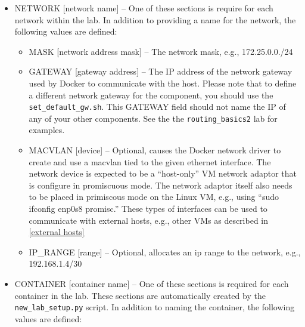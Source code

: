 \documentclass[12pt]{article}
\begin{document}
\begin{itemize}
\item NETWORK [network name] -- One of these sections is require for each network within the lab.  In addition to
providing a name for the network, the following values are defined:

\begin{itemize}
\item MASK [network address mask] -- The network mask, e.g., 172.25.0.0./24
\item GATEWAY [gateway address] -- The IP address of the network gateway used by Docker to communicate with the
host.  Please note that to define a different network gateway for the component, you should 
use the {\tt set\_default\_gw.sh}.  This GATEWAY field should not name the IP of any of your other components.  
See the the {\tt routing\_basics2} lab for examples.
\item MACVLAN [device] -- Optional, causes the Docker network driver to create and use a macvlan tied to the given ethernet
interface.  The network device is expected to be a ``host-only'' VM network adaptor that is configure in promiscuous mode.
The network adaptor itself also needs to be placed in primiscous mode on the Linux VM, e.g., using ``sudo ifconfig enp0s8 promisc.''
These types of interfaces can be used to communicate with external hosts, e.g., other VMs
as described in \ref{external hosts}  
\item IP\_RANGE [range] -- Optional, allocates an ip range to the network, e.g., 192.168.1.4/30
\end{itemize}

\item CONTAINER [container name] -- One of these sections is required for each container in the lab.
These sections are automatically created by the {\tt new\_lab\_setup.py} script.  In addition to 
naming the container, the following values are defined: 


\end{itemize}
\end{document}
